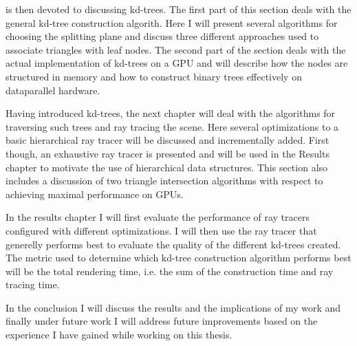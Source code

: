  is then devoted to discussing kd-trees. The first part
of this section deals with the general kd-tree construction algorith. Here I
will present several algorithms for choosing the splitting plane and discuss
three different approaches used to associate triangles with leaf nodes. The
second part of the section deals with the actual implementation of kd-trees on a
GPU and will describe how the nodes are structured in memory and how to
construct binary trees effectively on dataparallel hardware.


Having introduced kd-trees, the next chapter will deal with the algorithms for
traversing such trees and ray tracing the scene. Here several optimizations to a
basic hierarchical ray tracer will be discussed and incrementally added. First
though, an exhaustive ray tracer is presented and will be used in the Results
chapter to motivate the use of hierarchical data structures. This section also
includes a discussion of two triangle intersection algorithms with respect to
achieving maximal performance on GPUs.


In the results chapter I will first evaluate the performance of ray tracers
configured with different optimizations. I will then use the ray tracer that
generelly performs best to evaluate the quality of the different kd-trees
created. The metric used to determine which kd-tree construction algorithm
performs best will be the total rendering time, i.e. the sum of the construction
time and ray tracing time.


In the conclusion I will discuss the results and the implications of my work and
finally under future work I will address future improvements based on the
experience I have gained while working on this thesis.

